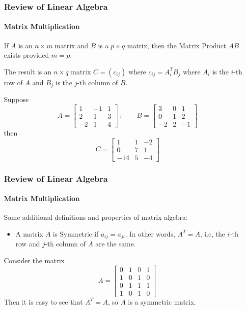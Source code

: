 \begin{frame}
\frametitle{Review of Linear Algebra}
\framesubtitle{Matrix Multiplication}
If $A$ is an $n\times m$ matrix and $B$ is a $p\times q$ matrix, then the {\bor Matrix Product $AB$}
exists provided $m=p$.

The result is an $n\times q$ matrix $C = (c_{ij})$ where $c_{ij} = A_i^TB_j$ where $A_i$ is the $i$-th row
of $A$ and $B_j$ is the $j$-th column of $B$.
\begin{examp}
Suppose
$$
A = \left[\begin{array}{rrr}
1 & -1 & 1 \\
2 & 1 & 3 \\
-2 & 1 & 4
\end{array}\right] \ ; \qquad
B = \left[\begin{array}{rrr}
3 & 0 & 1 \\
0 & 1 & 2 \\
-2 & 2 & -1
\end{array}\right]
$$
then
$$
C = \left[\begin{array}{rrr}
1 & 1 & -2 \\
0 & 7 & 1 \\
-14 & 5 & -4
\end{array}\right]
$$
\end{examp}
\end{frame}
\begin{frame}
\frametitle{Review of Linear Algebra}
\framesubtitle{Matrix Multiplication}
Some additional definitions and properties of matrix algebra:
\begin{itemize}
\item
A matrix  $A$ is {\bor Symmetric} if $a_{ij} = a_{ji}$.  In other words, $A^T=A$, i.e,
the $i$-th row and $j$-th column of $A$ are the same.
\end{itemize}
\begin{examp}
Consider the matrix
$$
A = \left[\begin{array}{cccc}
0 & 1 & 0 & 1 \\
1 & 0 & 1 & 0 \\
0 & 1 & 1 & 1 \\
1 & 0 & 1 & 0
\end{array}\right]
$$
Then it is easy to see that $A^T = A$, so $A$ is a symmetric matrix.
\end{examp}
\end{frame}
